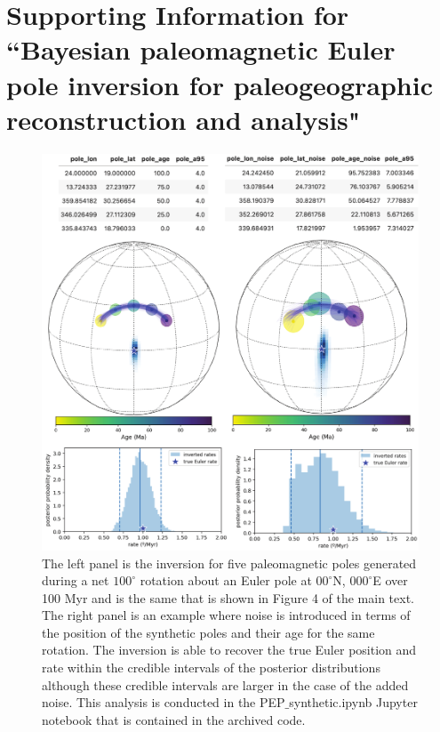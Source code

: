 \documentclass[11pt,letterpaper]{article}
\begin{document}
\renewcommand{\thefigure}{S\arabic{figure}}
\renewcommand{\thetable}{S\arabic{table}}
\section*{Supporting Information for ``Bayesian paleomagnetic Euler pole inversion for paleogeographic reconstruction and analysis"}

\begin{figure}[h!]
\noindent\includegraphics[width=5.8 in]{SI_fig_synthetic_noise.pdf}
\caption{The left panel is the inversion for five paleomagnetic poles generated during a net $100^\circ$ rotation about an Euler pole at $00^\circ$N, $000^\circ$E over 100 Myr and is the same that is shown in Figure 4 of the main text. The right panel is an example where noise is introduced in terms of the position of the synthetic poles and their age for the same rotation. The inversion is able to recover the true Euler position and rate within the credible intervals of the posterior distributions although these credible intervals are larger in the case of the added noise. This analysis is conducted in the PEP$\_$synthetic.ipynb Jupyter notebook that is contained in the archived code.}
\label{pdffiguresample}
\end{figure}
\end{document}
